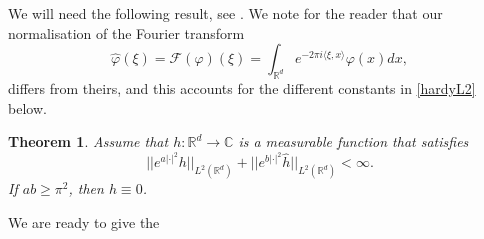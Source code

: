 \documentclass[11pt,a4paper]{amsart}
\def \vf{\varphi}
\newcommand{\Rm}{\mathbb R^d}
\numberwithin{equation}{section}
\newcommand{\sa}{\langle}
\newcommand{\da}{\rangle}
\newtheorem{theorem}{Theorem}[section]
\numberwithin{equation}{section}
\begin{document}
We will need the following result, see \cite[Theorem 1.1]{CEKPV}. We note for the reader that our normalisation of the Fourier transform
\begin{equation}\label{ft}
\hat \vf(\xi) = \mathscr F(\vf)(\xi) = \int_{\Rm} e^{-2\pi i\sa \xi,x\da} \vf(x) dx,
\end{equation}
differs from theirs, and this accounts for the different constants in \eqref{hardyL2} below. 


\begin{theorem}\label{T:har2}
Assume that $h:\Rm\to \mathbb C$ is a measurable function that satisfies 
\begin{equation}\label{hardyL2}
||e^{a|\cdot|^2} h||_{L^2(\Rm)} + ||e^{b|\cdot|^2} \hat h||_{L^2(\Rm)}<\infty.
\end{equation}
If $a b\ge \pi^2$, then $h\equiv 0$.  
\end{theorem} 


We are ready to give the 
\end{document}

